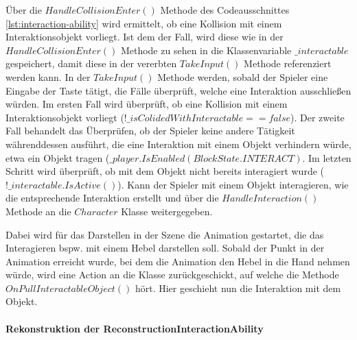Über die $HandleCollisionEnter()$ Methode des Codeausschnittes \ref{lst:interaction-ability} wird ermittelt, ob eine Kollision mit einem Interaktionsobjekt vorliegt. Ist dem der Fall, wird diese wie in der $HandleCollisionEnter()$ Methode zu sehen in die Klassenvariable $\_interactable$ gespeichert, damit diese in der vererbten $TakeInput()$ Methode referenziert werden kann.
 In der $TakeInput()$ Methode werden, sobald der Spieler eine Eingabe der Taste  tätigt, die Fälle überprüft, welche eine Interaktion ausschließen würden.
 Im ersten Fall wird überprüft, ob eine Kollision mit einem Interaktionsobjekt vorliegt ($!\_isColidedWithInteractable == false$). Der zweite Fall behandelt das Überprüfen, ob der Spieler keine andere Tätigkeit währenddessen ausführt, die eine Interaktion mit einem Objekt verhindern würde, etwa ein Objekt tragen ($\_player.IsEnabled(BlockState.INTERACT)$.
 Im letzten Schritt wird überprüft, ob mit dem Objekt nicht bereits interagiert wurde ($!\_interactable.IsActive()$).
Kann der Spieler mit einem Objekt interagieren, wie die entsprechende Interaktion erstellt und über die $HandleInteraction()$ Methode an die $Character$ Klasse weitergegeben.
 
Dabei wird für das Darstellen in der Szene die Animation gestartet, die das Interagieren bspw. mit einem Hebel darstellen soll. Sobald der Punkt in der Animation erreicht wurde, bei dem die Animation den Hebel in die Hand nehmen würde, wird eine Action an die Klasse zurückgeschickt, auf welche die  Methode $OnPullInteractableObject()$ hört. Hier geschieht nun die Interaktion mit dem Objekt.
\newpage
\paragraph{Rekonstruktion der ReconstructionInteractionAbility}
~

